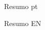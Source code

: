 
\TitlePage
\vspace*{55mm}
     {Resumo pt}
\EndTitlePage
\titlepage\ \endtitlepage %

\TitlePage
\vspace*{55mm}
     {Resumo EN}
\EndTitlePage
\titlepage\ \endtitlepage %
